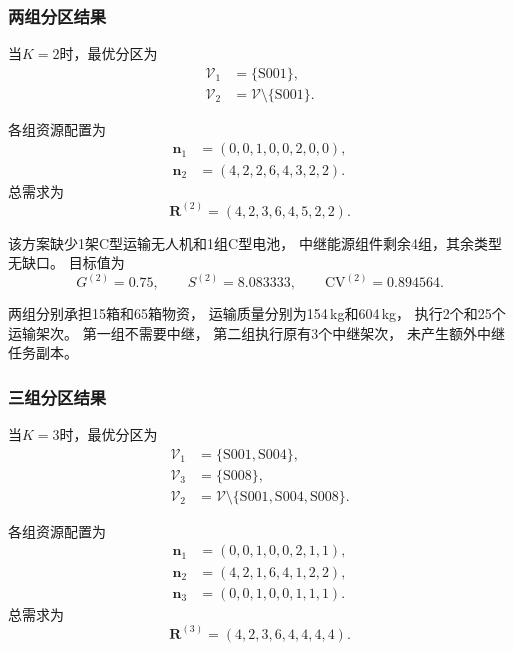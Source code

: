 \documentclass[bwprint]{gmcmthesis}
\begin{document}
\subsubsection{两组分区结果}

当$K=2$时，最优分区为
\begin{align}
\mathcal{V}_1&=\{\mathrm{S001}\},\\
\mathcal{V}_2&=\mathcal{V}\setminus\{\mathrm{S001}\}.
\end{align}

各组资源配置为
\begin{align}
\boldsymbol{n}_1&=(0,0,1,0,0,2,0,0),\\
\boldsymbol{n}_2&=(4,2,2,6,4,3,2,2).
\end{align}
总需求为
\begin{equation}
\boldsymbol{R}^{(2)}=(4,2,3,6,4,5,2,2).
\end{equation}

该方案缺少1架C型运输无人机和1组C型电池，
中继能源组件剩余4组，其余类型无缺口。
目标值为
\begin{equation}
G^{(2)}=0.75,\qquad
S^{(2)}=8.083333,\qquad
\mathrm{CV}^{(2)}=0.894564.
\end{equation}

两组分别承担15箱和65箱物资，
运输质量分别为154\,kg和604\,kg，
执行2个和25个运输架次。
第一组不需要中继，
第二组执行原有3个中继架次，
未产生额外中继任务副本。

\subsubsection{三组分区结果}

当$K=3$时，最优分区为
\begin{align}
\mathcal{V}_1&=\{\mathrm{S001},\mathrm{S004}\},\\
\mathcal{V}_3&=\{\mathrm{S008}\},\\
\mathcal{V}_2&=\mathcal{V}
\setminus\{\mathrm{S001},\mathrm{S004},\mathrm{S008}\}.
\end{align}

各组资源配置为
\begin{align}
\boldsymbol{n}_1&=(0,0,1,0,0,2,1,1),\\
\boldsymbol{n}_2&=(4,2,1,6,4,1,2,2),\\
\boldsymbol{n}_3&=(0,0,1,0,0,1,1,1).
\end{align}
总需求为
\begin{equation}
\boldsymbol{R}^{(3)}=(4,2,3,6,4,4,4,4).
\end{equation}
\end{document}
